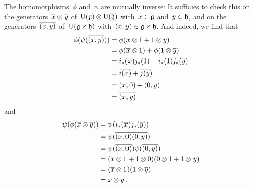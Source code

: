 \begin{example}
\begin{itemize}
      The homomorphisms~$\phi$ and~$\psi$ are mutually inverse:
      It sufficies to check this on the generators~$\overline{x} \otimes \overline{y}$ of~$\operatorname{U}(\mathfrak{g}) \otimes \operatorname{U}(\mathfrak{h})$ with~$x \in \mathfrak{g}$ and~$y \in \mathfrak{h}$, and on the generators~$\overline{(x,y)}$ of~$\operatorname{U}(\mathfrak{g} \times \mathfrak{h})$ with~$(x,y) \in \mathfrak{g} \times \mathfrak{h}$.
      And indeed, we find that
      \begin{align*}
        \phi( \psi( \overline{(x,y)} ) )
        &=
        \phi( \overline{x} \otimes 1 + 1 \otimes \overline{y} )
        \\
        &=
        \phi( \overline{x} \otimes 1 ) + \phi( 1 \otimes \overline{y} )
        \\
        &=
        i_*(\overline{x}) j_*(1) + i_*(1) j_*(\overline{y})
        \\
        &=
        \overline{i(x)} + \overline{j(y)}
        \\
        &=
        \overline{(x,0)} + \overline{(0,y)}
        \\
        &=
        \overline{(x,y)}
      \end{align*}
      and
      \begin{align*}
        \psi( \phi( \overline{x} \otimes \overline{y} ) )
        &=
        \psi( i_*(\overline{x}) j_*(\overline{y}) )
        \\
        &=
        \psi( \overline{(x,0)} \overline{(0,y)} )
        \\
        &=
        \psi( \overline{(x,0)} ) \psi( \overline{(0,y)} )
        \\
        &=
        ( \overline{x} \otimes 1 + 1 \otimes 0 ) ( 0 \otimes 1 + 1 \otimes \overline{y} )
        \\
        &=
        (\overline{x} \otimes 1) (1 \otimes \overline{y})
        \\
        &=
        \overline{x} \otimes \overline{y} \,.
      \end{align*}
  \end{itemize}
\end{example}



